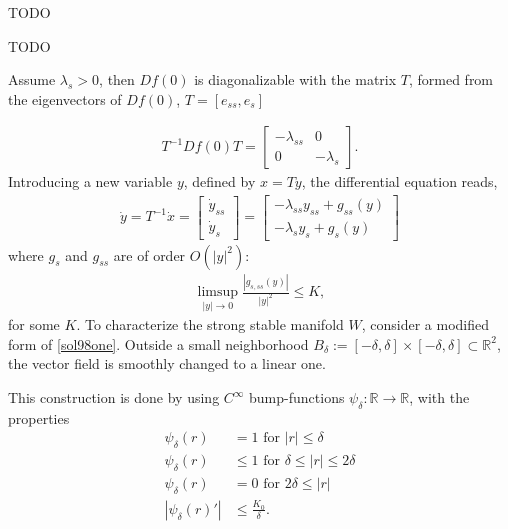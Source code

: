 \begin{solution}[9.6]
TODO	
\end{solution}

\begin{solution}[9.7]
TODO	
\end{solution}

\begin{solution}[9.8]
Assume $\lambda_s > 0$, then $Df(0)$ is diagonalizable with the matrix $T$, formed from the eigenvectors of $Df(0)$, $T= [e_{ss}, e_{s}]$

\begin{align}
T^{-1}Df(0)T = \begin{bmatrix}
-\lambda_{ss} & 0 \\
0 & -\lambda_{s}
 \end{bmatrix}.
\end{align}
Introducing a new variable $y$, defined by $x = Ty$, the differential equation reads,
\begin{align}
\dot{y} = T^{-1}\dot{x} = \begin{bmatrix} 
\dot{y}_{ss} \\ 
\dot{y}_{s}\end{bmatrix} = \begin{bmatrix}
-\lambda_{ss} y_{ss} + g_{ss}(y) \\
-\lambda_{s} y_{s} + g_{s}(y)
\end{bmatrix} \label{sol98one}   
\end{align}
where $g_s$ and $g_{ss}$ are of order $O(|y|^2)$:
\begin{align}
    \limsup_{|y|\to 0} \frac{|g_{s,ss}(y)|}{|y|^2}\leq K,
\end{align}
for some $K$. 
To characterize the strong stable manifold $W$, consider a modified form of \eqref{sol98one}. Outside a small neighborhood $B_\delta:=[-\delta, \delta] \times [-\delta, \delta]\subset \mathbb{R}^2$, the vector field is smoothly changed to a linear one. 

This construction is done by using $C^\infty$ bump-functions $\psi_\delta : \mathbb{R} \to \mathbb{R}$, with the properties 
\begin{align}
	\psi_\delta(r) &= 1 \text{ for } |r|\leq \delta \\
\psi_\delta(r) &\leq 1 \text{ for } \delta \leq |r|\leq 2\delta \\
\psi_\delta(r) &= 0 \text{ for } 2\delta \leq |r| \\
|\psi_\delta(r)'| &\leq \frac{K_0}{\delta}.
\end{align}


\end{solution}
